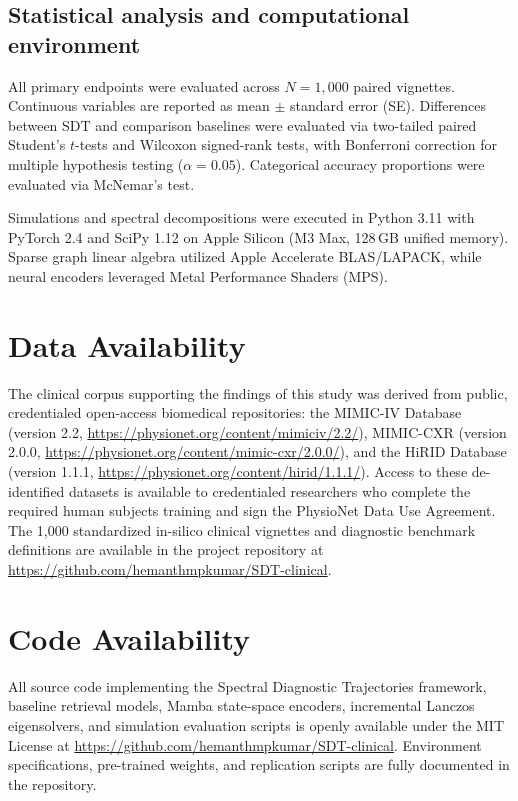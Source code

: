 \documentclass[12pt]{article}
\begin{document}
\subsection*{Statistical analysis and computational environment}

All primary endpoints were evaluated across $N=1{,}000$ paired vignettes. Continuous variables are reported as mean $\pm$ standard error (SE). Differences between SDT and comparison baselines were evaluated via two-tailed paired Student's $t$-tests and Wilcoxon signed-rank tests, with Bonferroni correction for multiple hypothesis testing ($\alpha = 0.05$). Categorical accuracy proportions were evaluated via McNemar's test.

Simulations and spectral decompositions were executed in Python 3.11 with PyTorch 2.4 and SciPy 1.12 on Apple Silicon (M3 Max, 128\,GB unified memory). Sparse graph linear algebra utilized Apple Accelerate BLAS/LAPACK, while neural encoders leveraged Metal Performance Shaders (MPS).

\section*{Data Availability}
The clinical corpus supporting the findings of this study was derived from public, credentialed open-access biomedical repositories: the MIMIC-IV Database (version 2.2, \url{https://physionet.org/content/mimiciv/2.2/}), MIMIC-CXR (version 2.0.0, \url{https://physionet.org/content/mimic-cxr/2.0.0/}), and the HiRID Database (version 1.1.1, \url{https://physionet.org/content/hirid/1.1.1/}). Access to these de-identified datasets is available to credentialed researchers who complete the required human subjects training and sign the PhysioNet Data Use Agreement. The 1,000 standardized in-silico clinical vignettes and diagnostic benchmark definitions are available in the project repository at \url{https://github.com/hemanthmpkumar/SDT-clinical}.

\section*{Code Availability}
All source code implementing the Spectral Diagnostic Trajectories framework, baseline retrieval models, Mamba state-space encoders, incremental Lanczos eigensolvers, and simulation evaluation scripts is openly available under the MIT License at \url{https://github.com/hemanthmpkumar/SDT-clinical}. Environment specifications, pre-trained weights, and replication scripts are fully documented in the repository.
\end{document}
